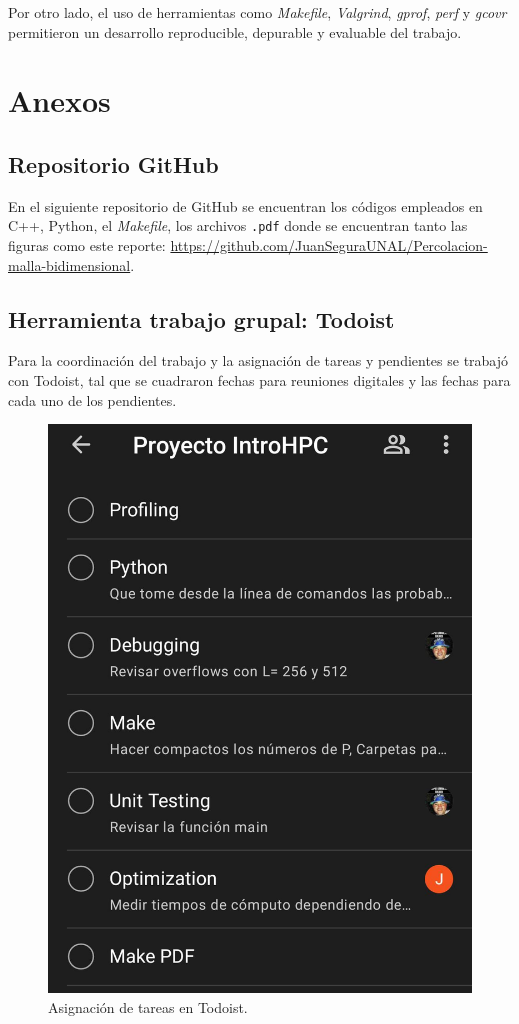 \documentclass[%
 reprint,
 amsmath,amssymb,
 aps,
]{revtex4-2}
\begin{document}
Por otro lado, el uso de herramientas como \textit{Makefile}, \textit{Valgrind}, \textit{gprof}, \textit{perf} y \textit{gcovr} permitieron un desarrollo reproducible, depurable y evaluable del trabajo.
\vspace{0.2 cm}




\section{Anexos}

\subsection{Repositorio GitHub}

En el siguiente repositorio de GitHub se encuentran los códigos empleados en C++, Python, el \textit{Makefile}, los archivos \texttt{.pdf} donde se encuentran tanto las figuras como este reporte: \url{https://github.com/JuanSeguraUNAL/Percolacion-malla-bidimensional}.

\subsection{Herramienta trabajo grupal: Todoist}

Para la coordinación del trabajo y la asignación de tareas y pendientes se trabajó con Todoist, tal que se cuadraron fechas para reuniones digitales y las fechas para cada uno de los pendientes.

\begin{figure}[H]
    \centering
    \includegraphics[width=0.8\linewidth]{todoist.jpeg}
    \caption{Asignación de tareas en Todoist.}
    \label{fig: todoist}
\end{figure}
\end{document}
